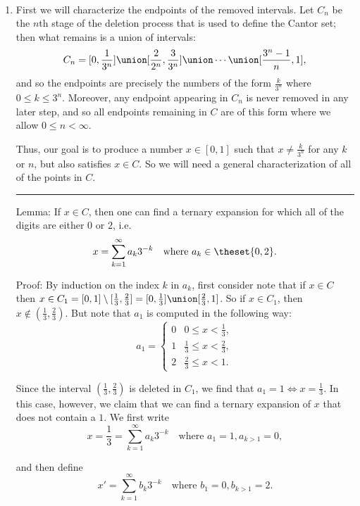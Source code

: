 \begin{solution}\hfill\\
  \begin{enumerate}
    \item First we will characterize the endpoints of the removed intervals. Let $C_n$ be the $n$th stage of the deletion process that is used to define the Cantor set; then what remains is a union of intervals:
      $$
      C_n = [0, \frac 1 {3^n}] \union [\frac 2 {2^n}, \frac 3 {3^n}] \union \cdots \union[\frac {3^n-1} n, 1],
      $$
    and so the endpoints are precisely the numbers of the form $\frac{k}{3^n}$ where $0 \leq k \leq 3^n$. Moreover, any endpoint appearing in $C_n$ is never removed in any later step, and so all endpoints remaining in $C$ are of this form where we allow $0\leq n < \infty$.

    Thus, our goal is to produce a number $x\in [0,1]$ such that $x \neq \frac k {3^n}$ for any $k$ or $n$, but also satisfies $x\in C$. So we will need a general characterization of all of the points in $C$.

    \vspace{1em}\hrule

    Lemma: If $x\in C$, then one can find a ternary expansion for which all of the digits are either $0$ or $2$, i.e.
    $$
    x = \sum_{k=1}^\infty a_k 3^{-k} \quad \text{where } a_k \in \theset{0, 2}.
    $$

    Proof: By induction on the index $k$ in $a_k$, first consider note that if $x\in C$ then $x \in C_1 = [0, 1] \setminus [\frac 1 3, \frac 2 3]= [0, \frac 1 3] \union [\frac 2 3, 1]$. So if $x\in C_1$, then $x\not\in(\frac 1 3, \frac 2 3)$. But note that $a_1$ is computed in the following way:
    $$
    a_1 = \begin{cases}
      0 & 0 \leq x < \frac 1 3, \\
      1 & \frac 1 3 \leq x < \frac 2 3, \\
      2 & \frac 2 3 \leq x < 1.
    \end{cases}
    $$

    Since the interval $(\frac 1 3, \frac 2 3)$ is deleted in $C_1$, we find that $a_1 = 1 \iff x = \frac 1 3$. In this case, however, we claim that we can find a ternary expansion of $x$ that does not contain a $1$.  We first write
    $$
    x = \frac 1 3 = \sum_{k=1}^\infty a_k 3^{-k} \quad \text{where } a_1 = 1, a_{k>1} = 0,
    $$

    and then define
    $$
    x' = \sum_{k=1}^\infty b_k 3^{-k} \quad\text{where } b_1 = 0, b_{k>1} = 2.
    $$


\end{enumerate}
\end{solution}
